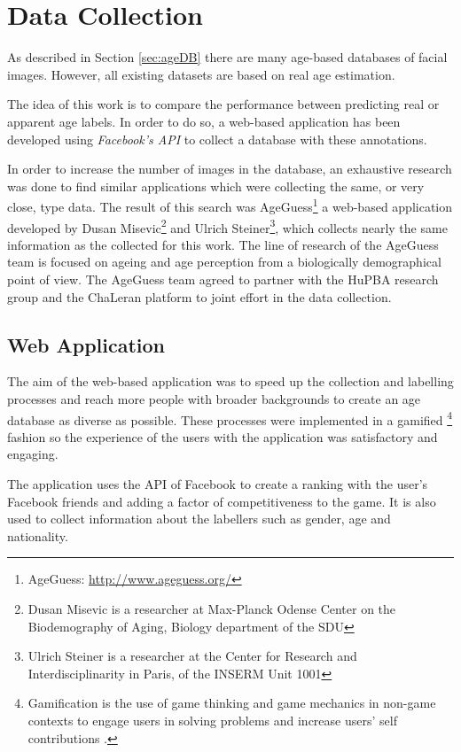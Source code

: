 \chapter{Data Collection} \label{chap:data}

As described in Section \ref{sec:ageDB} there are many age-based databases of facial images. However, all existing datasets are based on real age estimation. 

The idea of this work is to compare the performance between predicting real or apparent age labels. In order to do so, a web-based application has been developed using \textit{Facebook's API} to collect a database with these annotations. 

In order to increase the number of images in the database, an exhaustive research was done to find similar applications which were collecting the same, or very close, type data. The result of this search was AgeGuess\footnote{AgeGuess: \url{http://www.ageguess.org/}} a web-based application developed by Dusan Misevic\footnote{Dusan Misevic is a researcher at Max-Planck Odense Center on the Biodemography of Aging, Biology department of the SDU} and 
Ulrich Steiner\footnote{Ulrich Steiner is a researcher at the Center for Research and Interdisciplinarity in Paris, of the INSERM Unit 1001}, which collects nearly the same information as the collected for this work. The line of research of the AgeGuess team is focused on ageing and age perception from a biologically demographical point of view. The AgeGuess team agreed to partner with the HuPBA research group and the ChaLeran platform to joint effort in the data collection.

\section{Web Application}

The aim of the web-based application was to speed up the collection and labelling processes and reach more people with broader backgrounds to create an age database as diverse as possible. These processes were implemented in a gamified \footnote{Gamification is the use of game thinking and game mechanics in non-game contexts to engage users in solving problems and increase users' self contributions \cite{Deterding:2011:GDE:2181037.2181040}.} fashion so the experience of the users with the application was satisfactory and engaging. 

The application uses the API of Facebook to create a ranking with the user's Facebook friends and adding a factor of competitiveness to the game. It is also used to collect information about the labellers such as gender, age and nationality.

